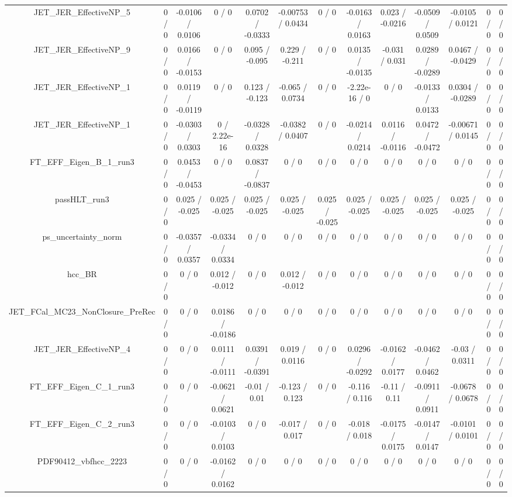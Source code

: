 \documentclass[10pt]{article}
\begin{document}
\begin{table}[htbp]
\begin{center}
\begin{tabular}{|c|c|c|c|c|c|c|c|c|c|c|c|c|}
  JET_JER_EffectiveNP_5 & 0 / 0 & -0.0106 / 0.0106 & 0 / 0 & 0.0702 / -0.0333 & -0.00753 / 0.0434 & 0 / 0 & -0.0163 / 0.0163 & 0.023 / -0.0216 & -0.0509 / 0.0509 & -0.0105 / 0.0121 & 0 / 0 & 0 / 0 \\ 
  JET_JER_EffectiveNP_9 & 0 / 0 & 0.0166 / -0.0153 & 0 / 0 & 0.095 / -0.095 & 0.229 / -0.211 & 0 / 0 & 0.0135 / -0.0135 & -0.031 / 0.031 & 0.0289 / -0.0289 & 0.0467 / -0.0429 & 0 / 0 & 0 / 0 \\ 
  JET_JER_EffectiveNP_1 & 0 / 0 & 0.0119 / -0.0119 & 0 / 0 & 0.123 / -0.123 & -0.065 / 0.0734 & 0 / 0 & -2.22e-16 / 0 & 0 / 0 & -0.0133 / 0.0133 & 0.0304 / -0.0289 & 0 / 0 & 0 / 0 \\ 
  JET_JER_EffectiveNP_1 & 0 / 0 & -0.0303 / 0.0303 & 0 / 2.22e-16 & -0.0328 / 0.0328 & -0.0382 / 0.0407 & 0 / 0 & -0.0214 / 0.0214 & 0.0116 / -0.0116 & 0.0472 / -0.0472 & -0.00671 / 0.0145 & 0 / 0 & 0 / 0 \\ 
  FT_EFF_Eigen_B_1_run3 & 0 / 0 & 0.0453 / -0.0453 & 0 / 0 & 0.0837 / -0.0837 & 0 / 0 & 0 / 0 & 0 / 0 & 0 / 0 & 0 / 0 & 0 / 0 & 0 / 0 & 0 / 0 \\ 
  passHLT_run3 & 0 / 0 & 0.025 / -0.025 & 0.025 / -0.025 & 0.025 / -0.025 & 0.025 / -0.025 & 0.025 / -0.025 & 0.025 / -0.025 & 0.025 / -0.025 & 0.025 / -0.025 & 0.025 / -0.025 & 0 / 0 & 0 / 0 \\ 
  ps_uncertainty_norm & 0 / 0 & -0.0357 / 0.0357 & -0.0334 / 0.0334 & 0 / 0 & 0 / 0 & 0 / 0 & 0 / 0 & 0 / 0 & 0 / 0 & 0 / 0 & 0 / 0 & 0 / 0 \\ 
  hcc_BR & 0 / 0 & 0 / 0 & 0.012 / -0.012 & 0 / 0 & 0.012 / -0.012 & 0 / 0 & 0 / 0 & 0 / 0 & 0 / 0 & 0 / 0 & 0 / 0 & 0 / 0 \\ 
  JET_FCal_MC23_NonClosure_PreRec & 0 / 0 & 0 / 0 & 0.0186 / -0.0186 & 0 / 0 & 0 / 0 & 0 / 0 & 0 / 0 & 0 / 0 & 0 / 0 & 0 / 0 & 0 / 0 & 0 / 0 \\ 
  JET_JER_EffectiveNP_4 & 0 / 0 & 0 / 0 & 0.0111 / -0.0111 & 0.0391 / -0.0391 & 0.019 / 0.0116 & 0 / 0 & 0.0296 / -0.0292 & -0.0162 / 0.0177 & -0.0462 / 0.0462 & -0.03 / 0.0311 & 0 / 0 & 0 / 0 \\ 
  FT_EFF_Eigen_C_1_run3 & 0 / 0 & 0 / 0 & -0.0621 / 0.0621 & -0.01 / 0.01 & -0.123 / 0.123 & 0 / 0 & -0.116 / 0.116 & -0.11 / 0.11 & -0.0911 / 0.0911 & -0.0678 / 0.0678 & 0 / 0 & 0 / 0 \\ 
  FT_EFF_Eigen_C_2_run3 & 0 / 0 & 0 / 0 & -0.0103 / 0.0103 & 0 / 0 & -0.017 / 0.017 & 0 / 0 & -0.018 / 0.018 & -0.0175 / 0.0175 & -0.0147 / 0.0147 & -0.0101 / 0.0101 & 0 / 0 & 0 / 0 \\ 
  PDF90412_vbfhcc_2223 & 0 / 0 & 0 / 0 & -0.0162 / 0.0162 & 0 / 0 & 0 / 0 & 0 / 0 & 0 / 0 & 0 / 0 & 0 / 0 & 0 / 0 & 0 / 0 & 0 / 0 \\ 

\end{tabular}
\end{center}
\end{table}
\end{document}
